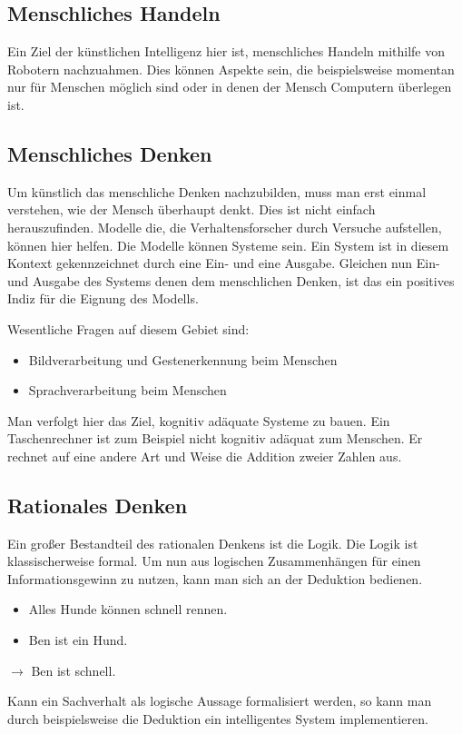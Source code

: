 \subsection{Menschliches Handeln}
Ein Ziel der künstlichen Intelligenz hier ist, menschliches Handeln mithilfe von Robotern nachzuahmen. Dies können Aspekte sein, die beispielsweise momentan nur für Menschen möglich sind oder in denen der Mensch Computern überlegen ist.    

\subsection{Menschliches Denken}
Um künstlich das menschliche Denken nachzubilden, muss  man erst einmal verstehen, wie der Mensch überhaupt denkt. Dies ist nicht einfach herauszufinden. Modelle die, die Verhaltensforscher durch Versuche aufstellen,  können hier helfen. Die Modelle können Systeme sein. Ein System ist in diesem Kontext gekennzeichnet durch eine Ein- und eine Ausgabe. Gleichen nun Ein- und Ausgabe des Systems denen dem menschlichen Denken, ist das ein positives Indiz für die Eignung des Modells.

Wesentliche Fragen auf diesem Gebiet sind:
\begin{itemize}
\item Bildverarbeitung und Gestenerkennung beim Menschen
\item Sprachverarbeitung beim Menschen
\end{itemize}    

Man verfolgt hier das Ziel, kognitiv adäquate Systeme zu bauen. Ein Taschenrechner ist zum Beispiel nicht kognitiv adäquat zum Menschen. Er rechnet auf eine andere Art und Weise die Addition zweier Zahlen aus.
\subsection{Rationales Denken}
Ein großer Bestandteil des rationalen Denkens ist die Logik. Die Logik ist klassischerweise formal. Um nun aus logischen Zusammenhängen für einen Informationsgewinn zu nutzen, kann man sich an der Deduktion bedienen. 

\begin{itemize}
\item Alles Hunde können schnell rennen.
\item Ben ist ein Hund.
\end{itemize}
$\rightarrow$ Ben ist schnell.

Kann ein Sachverhalt als logische Aussage formalisiert werden, so kann man durch beispielsweise die Deduktion ein intelligentes System implementieren. 

